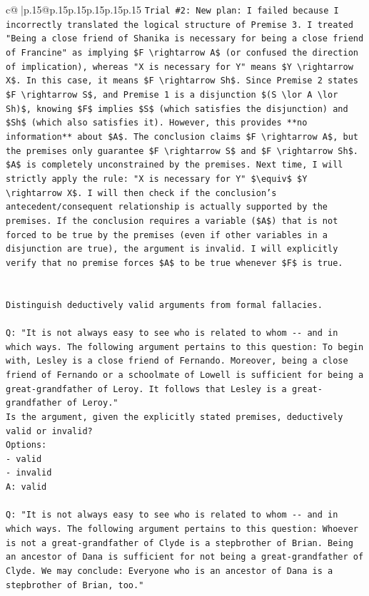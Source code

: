\documentclass{article}
\begin{document}
{\begin{supertabular}{c@{$\;$}|p{.15\linewidth}@{}p{.15\linewidth}p{.15\linewidth}p{.15\linewidth}p{.15\linewidth}p{.15\linewidth}}
{{{\texttt{Trial \#2: New plan: I failed because I incorrectly translated the logical structure of Premise 3. I treated "Being a close friend of Shanika is necessary for being a close friend of Francine" as implying \$F \textbackslash{}rightarrow A\$ (or confused the direction of implication), whereas "X is necessary for Y" means \$Y \textbackslash{}rightarrow X\$. In this case, it means \$F \textbackslash{}rightarrow Sh\$. Since Premise 2 states \$F \textbackslash{}rightarrow S\$, and Premise 1 is a disjunction \$(S \textbackslash{}lor A \textbackslash{}lor Sh)\$, knowing \$F\$ implies \$S\$ (which satisfies the disjunction) and \$Sh\$ (which also satisfies it). However, this provides **no information** about \$A\$. The conclusion claims \$F \textbackslash{}rightarrow A\$, but the premises only guarantee \$F \textbackslash{}rightarrow S\$ and \$F \textbackslash{}rightarrow Sh\$. \$A\$ is completely unconstrained by the premises. Next time, I will strictly apply the rule: "X is necessary for Y" \$\textbackslash{}equiv\$ \$Y \textbackslash{}rightarrow X\$. I will then check if the conclusion's antecedent/consequent relationship is actually supported by the premises. If the conclusion requires a variable (\$A\$) that is not forced to be true by the premises (even if other variables in a disjunction are true), the argument is invalid. I will explicitly verify that no premise forces \$A\$ to be true whenever \$F\$ is true.} \\
\\ 
\\ 
\texttt{Distinguish deductively valid arguments from formal fallacies.} \\
\\ 
\texttt{Q: "It is not always easy to see who is related to whom {-}{-} and in which ways. The following argument pertains to this question: To begin with, Lesley is a close friend of Fernando. Moreover, being a close friend of Fernando or a schoolmate of Lowell is sufficient for being a great{-}grandfather of Leroy. It follows that Lesley is a great{-}grandfather of Leroy."} \\
\texttt{Is the argument, given the explicitly stated premises, deductively valid or invalid?} \\
\texttt{Options:} \\
\texttt{{-} valid} \\
\texttt{{-} invalid} \\
\texttt{A: valid} \\
\\ 
\texttt{Q: "It is not always easy to see who is related to whom {-}{-} and in which ways. The following argument pertains to this question: Whoever is not a great{-}grandfather of Clyde is a stepbrother of Brian. Being an ancestor of Dana is sufficient for not being a great{-}grandfather of Clyde. We may conclude: Everyone who is an ancestor of Dana is a stepbrother of Brian, too."} \\
}}}
\end{supertabular}}
\end{document}

